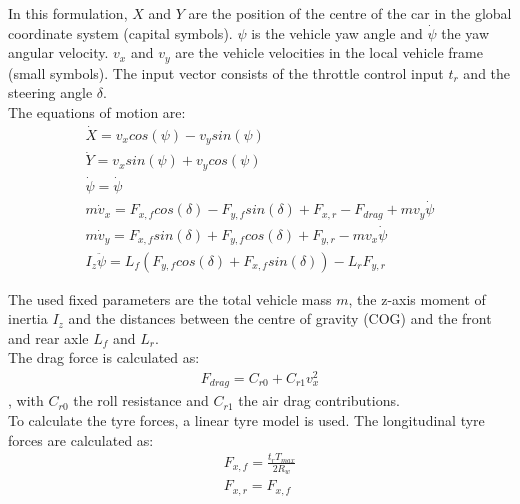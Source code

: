 In this formulation, $X$ and $Y$ are the position of the centre of the car in the global coordinate system (capital symbols). $\psi$ is the vehicle yaw angle and $\dot{\psi}$ the yaw angular velocity. $v_x$ and $v_y$ are the vehicle velocities in the local vehicle frame (small symbols). The input vector consists of the throttle control input $t_r$ and the steering angle $\delta$.\\

The equations of motion \cite{TongDuySon2019} are:
\begin{equation}\label{eq:bicycle_model_eqmotion}
\begin{aligned}
\dot{X} = v_x cos(\psi) - v_y sin(\psi)\\
\dot{Y} = v_x sin(\psi) + v_y cos(\psi)\\
\dot{\psi} = \dot{\psi}\\
m \dot{v}_x = F_{x,f} cos(\delta) - F_{y,f} sin(\delta) + F_{x,r} - F_{drag} + m v_y \dot{\psi}\\
m \dot{v}_y = F_{x,f} sin(\delta) + F_{y,f} cos(\delta) + F_{y,r} - m v_x \dot{\psi}\\
I_z \ddot{\psi} = L_f (F_{y,f} cos(\delta) + F_{x,f} sin(\delta)) - L_r F_{y,r}
\end{aligned}
\end{equation}

The used fixed parameters are the total vehicle mass $m$, the z-axis moment of inertia $I_z$ and the distances between the centre of gravity (COG) and the front and rear axle $L_f$ and $L_r$.\\

The drag force is calculated as:
\begin{equation}\label{eq:bicycle_Fdrag}
\begin{aligned}
F_{drag} = C_{r0} + C_{r1} v_x^2
\end{aligned}
\end{equation},
with $C_{r0}$ the roll resistance and $C_{r1}$ the air drag contributions.\\

To calculate the tyre forces, a linear tyre model is used. The longitudinal tyre forces are calculated as:
\begin{equation}\label{eq:bicycle_Fx}
\begin{aligned}
F_{x,f} = \frac{t_r T_{max}}{2 R_w}\\
F_{x,r} = F_{x, f}
\end{aligned}
\end{equation}

